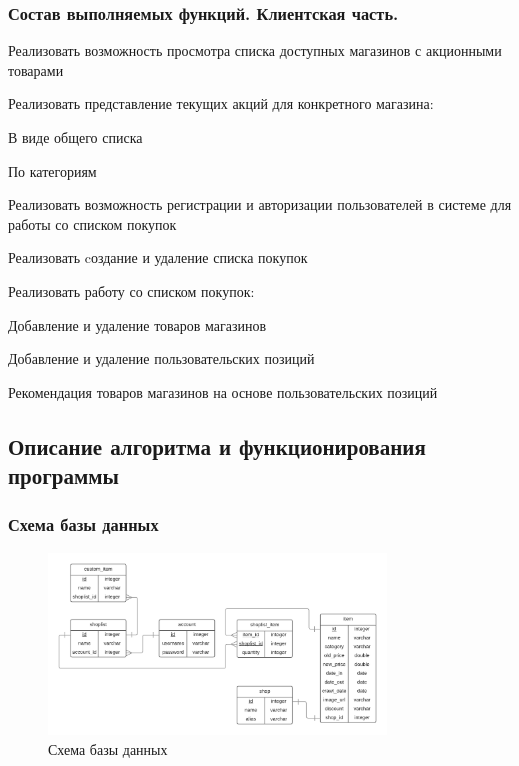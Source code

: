 \subsubsection{Состав выполняемых функций. Клиентская часть.}
\begin{my_enumerate}
  \item Реализовать возможность просмотра списка доступных магазинов с акционными товарами
  \item Реализовать представление текущих акций для конкретного магазина:
    \begin{my_enumerate}
      \item В виде общего списка
      \item По категориям
    \end{my_enumerate}
  \item Реализовать возможность регистрации и авторизации пользователей в системе для
    работы со списком покупок
  \item Реализовать cоздание и удаление списка покупок
  \item Реализовать работу со списком покупок:
    \begin{my_enumerate}
      \item Добавление и удаление товаров магазинов
      \item Добавление и удаление пользовательских позиций
      \item Рекомендация товаров магазинов на основе пользовательских позиций 
    \end{my_enumerate}
\end{my_enumerate}

\subsection{Описание алгоритма и функционирования программы}

\subsubsection{Схема базы данных}
\begin{figure}[!htbp]
    \centering
    \includegraphics[width=0.8\textwidth]{./pics/database.png}
    \caption{\small{Схема базы данных}}
    \label{database}
\end{figure}

